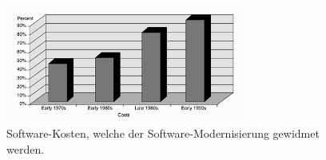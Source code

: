 \begin{figure}[h] 
  \centering
  \includegraphics[width=0.7\textwidth]{Chapters/2-Lehmanns-Gesetze/images/costsDevotedToSoftwareModernization.png}
  \caption{Software-Kosten, welche der Software-Modernisierung gewidmet werden. \cite{seacord_modernizing_2003}}
  \label{fig:costsOfModernization}
\end{figure}

\pagebreak

